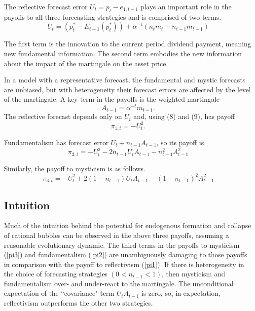 \documentclass[12pt]{article}
\begin{document}
The reflective forecast error $U_{t}=p_{t}-e_{1, t-1}$ plays an important role in the payoffs to all three forecasting strategies and is comprised of two terms.
\begin{equation}
U_{t}=\left(p_{t}^{*}-E_{t-1}\left(p_{t}^{*}\right)\right)+\alpha^{-t}\left(n_{t} m_{t}-n_{t-1} m_{t-1}\right)
\label{U}
\end{equation}

The first term is the innovation to the current period dividend payment, meaning new fundamental information. The second term embodies the new information about the impact of the martingale on the asset price.

In a model with a representative forecast, the fundamental and mystic forecasts are unbiased, but with heterogeneity their forecast errors are affected by the level of the martingale. A key term in the payoffs is the weighted martingale 
\begin{equation}
A_{t-1}=\alpha^{-t} m_{t-1}.
\label{A}
\end{equation}
The reflective forecast depends only on $U_{t}$ and, using (8) and (9), has payoff
\begin{equation}
\pi_{1, t}=-U_{t}^{2} \label{pi1}.
\end{equation}

Fundamentalism has forecast error $U_{t}+n_{t-1} A_{t-1}$, so its payoff is
\begin{equation}
\pi_{2, t}=-U_{t}^{2}-2 n_{t-1} U_{t} A_{t-1}-n_{t-1}^{2} A_{t-1}^{2} \label{pi2}
\end{equation}

Similarly, the payoff to mysticism is as follows.
\begin{equation}
\pi_{3, t}=-U_{t}^{2}+2\left(1-n_{t-1}\right) U_{t} A_{t-1}-\left(1-n_{t-1}\right)^{2} A_{t-1}^{2} \label{pi3}
\end{equation}

\subsection{Intuition}
Much of the intuition behind the potential for endogenous formation and collapse of rational bubbles can be observed in the above three payoffs, assuming a reasonable evolutionary dynamic. The third terms in the payoffs to mysticism (\ref{pi3}) and fundamentalism (\ref{pi2}) are unambiguously damaging to those payoffs in comparison with the payoff to reflectivism (\ref{pi1}). If there is heterogeneity in the choice of forecasting strategies $\left(0<n_{t-1}<1\right)$, then mysticism and fundamentalism over- and under-react to the martingale. The unconditional expectation of the ``covariance" term $U_{t} A_{t-1}$ is zero, so, in expectation, reflectivism outperforms the other two strategies.
\end{document}
